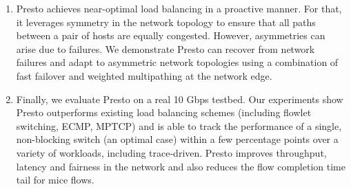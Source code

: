 \begin{enumerate}

\item Presto achieves near-optimal load balancing in a proactive manner. For that, it leverages symmetry in 
the network topology to ensure that all paths between a pair of hosts are equally congested. 
However, asymmetries can arise due to failures. We demonstrate Presto can recover from network failures and adapt to asymmetric 
network topologies using a combination of fast failover and weighted multipathing at the network edge.


\item Finally, we evaluate Presto on a real 10 Gbps testbed. Our experiments show Presto
outperforms existing load balancing schemes (including flowlet switching, ECMP, MPTCP) and 
is able to track the performance of a single, non-blocking switch (an optimal case) within a few percentage points
over a variety of workloads, including trace-driven. Presto improves throughput, latency and fairness in the network and 
also reduces the flow completion time tail for mice flows.

\end{enumerate}


